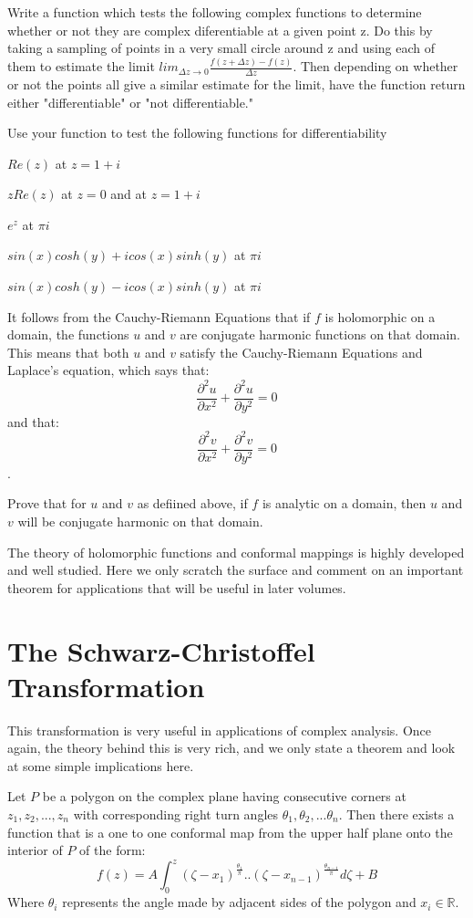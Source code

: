 \begin{problem}
Write a function which tests the following complex functions to determine whether or not they are complex diferentiable at a given point z. Do this by taking a sampling of points in a very small circle around z and using each of them to estimate the limit $lim_{\Delta z \to 0} \frac{f(z+\Delta z)-f(z)}{\Delta z}$. Then depending on whether or not the points all give a similar estimate for the limit, have the function return either "differentiable" or "not differentiable." 

Use your function to test the following functions for differentiability

$Re(z)$ at $z=1+ i$

$z Re(z)$ at $z=0$ and at $z=1+ i$

$e^z$ at $\pi i$

$sin(x) cosh(y) + i cos(x) sinh(y)$ at $\pi i$

$sin(x) cosh(y) - i cos(x) sinh(y)$ at $\pi i$
\end{problem}

It follows from the Cauchy-Riemann Equations that if $f$ is holomorphic on a domain, the functions $u$ and $v$ are conjugate harmonic functions on that domain. This means that both $u$ and $v$ satisfy the Cauchy-Riemann Equations and Laplace's equation, which says that: $$\frac{\partial^2 u}{\partial x^2}+\frac{\partial^2 u}{\partial y^2}=0$$ and that: $$\frac{\partial^2 v}{\partial x^2}+\frac{\partial^2 v}{\partial y^2}=0$$. 

\begin{problem}
Prove that for $u$ and $v$ as defiined above, if $f$ is analytic on a domain, then $u$ and $v$ will be conjugate harmonic on that domain.
\end{problem}

The theory of holomorphic functions and conformal mappings is highly developed and well studied.  Here we only scratch the surface and comment on an important theorem for applications that will be useful in later volumes.

\section*{The Schwarz-Christoffel Transformation}
This transformation is very useful in applications of complex analysis.  Once again, the theory behind this is very rich, and we only state a theorem and look at some simple implications here.

\begin{theorem}  Let $P$ be a polygon on the complex plane having consecutive corners at $z_1, z_2, ..., z_n$ with corresponding right turn angles $\theta_1, \theta_2,...\theta_n$.  Then there exists a function that is a one to one conformal map from the upper half plane onto the interior of $P$ of the form:
\[
f(z) = A\int_0^z (\zeta - x_1)^{\frac{\theta_1}{\pi}}..(\zeta - x_{n-1})^{\frac{\theta_{n-1}}{\pi}}d\zeta + B
\]
Where $\theta_i$ represents the angle made by adjacent sides of the polygon and $x_i \in \mathbb{R}$.
\end{theorem}

